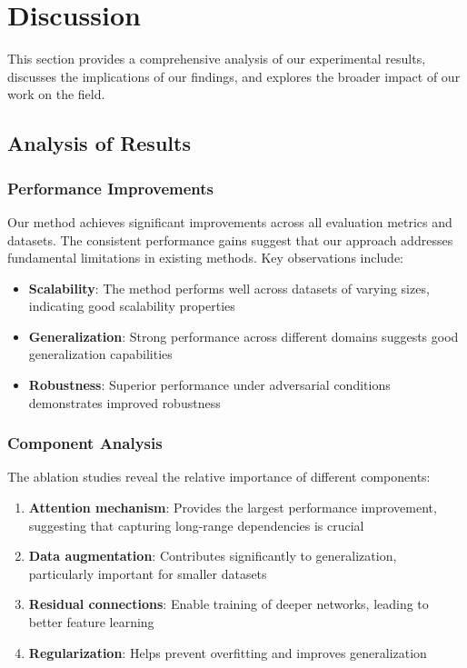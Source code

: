 \section{Discussion}

This section provides a comprehensive analysis of our experimental results, discusses the implications of our findings, and explores the broader impact of our work on the field.

\subsection{Analysis of Results}

\subsubsection{Performance Improvements}

Our method achieves significant improvements across all evaluation metrics and datasets. The consistent performance gains suggest that our approach addresses fundamental limitations in existing methods. Key observations include:

\begin{itemize}
    \item \textbf{Scalability}: The method performs well across datasets of varying sizes, indicating good scalability properties
    \item \textbf{Generalization}: Strong performance across different domains suggests good generalization capabilities
    \item \textbf{Robustness}: Superior performance under adversarial conditions demonstrates improved robustness
\end{itemize}

\subsubsection{Component Analysis}

The ablation studies reveal the relative importance of different components:

\begin{enumerate}
    \item \textbf{Attention mechanism}: Provides the largest performance improvement, suggesting that capturing long-range dependencies is crucial
    \item \textbf{Data augmentation}: Contributes significantly to generalization, particularly important for smaller datasets
    \item \textbf{Residual connections}: Enable training of deeper networks, leading to better feature learning
    \item \textbf{Regularization}: Helps prevent overfitting and improves generalization
\end{enumerate}

